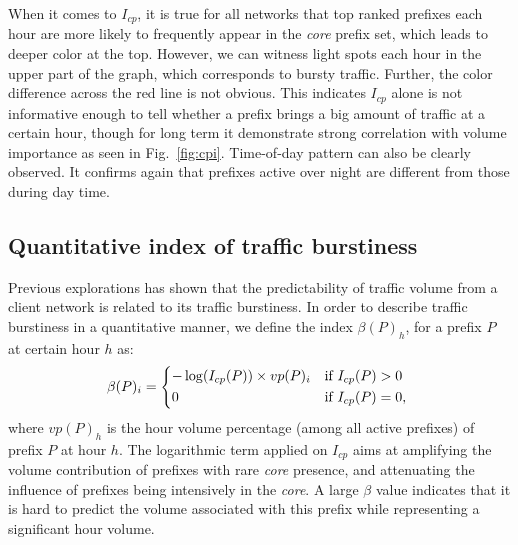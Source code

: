 When it comes to $I_{cp}$, it is true for all networks that top ranked prefixes each hour are more likely to frequently appear in the \textit{core} prefix set, which leads to deeper color at the top.
However, we can witness light spots each hour in the upper part of the graph, which corresponds to bursty traffic.
Further, the color difference across the red line is not obvious.
This indicates $I_{cp}$ alone is not informative enough to tell whether a prefix brings a big amount of traffic at a certain hour, though for long term it demonstrate strong correlation with volume importance as seen in Fig.~\ref{fig:cpi}.
Time-of-day pattern can also be clearly observed. It confirms again that prefixes active over night are different from those during day time.


\subsection{Quantitative index of traffic burstiness}
Previous explorations has shown that the predictability of traffic volume from a client network is related to its traffic burstiness.
In order to describe traffic burstiness in a quantitative manner, we define the index $\beta(P)_h$, for a prefix $P$ at certain hour $h$ as:
\begin{equation*}
\beta(P)_i = \begin{dcases*}
         -\log(I_{cp}(P)) \times vp(P)_i & if $I_{cp}(P) > 0$\\
        0 & if $I_{cp}(P) = 0$,
        \end{dcases*}
\label{eq:beta}
\end{equation*}
where $vp(P)_h$ is the hour volume percentage (among all active prefixes) of prefix $P$ at hour $h$.
The logarithmic term applied on $I_{cp}$ aims at amplifying the volume contribution of prefixes with rare \textit{core} presence, and attenuating the influence of prefixes being intensively in the \textit{core}.
A large $\beta$ value indicates that it is hard to predict the volume associated with this prefix while representing a significant hour volume.

